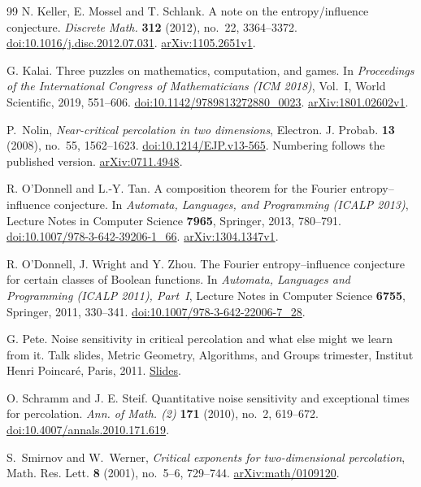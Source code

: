 \documentclass[11pt]{amsart}
\theoremstyle{remark}
\begin{document}
\begin{thebibliography}{99}
N. Keller, E. Mossel and T. Schlank.
A note on the entropy/influence conjecture.
\emph{Discrete Math.} \textbf{312} (2012), no.~22, 3364--3372.
\href{https://doi.org/10.1016/j.disc.2012.07.031}{doi:10.1016/j.disc.2012.07.031}.
\href{https://arxiv.org/abs/1105.2651v1}{arXiv:1105.2651v1}.

G. Kalai.
Three puzzles on mathematics, computation, and games.
In \emph{Proceedings of the International Congress of Mathematicians (ICM 2018)}, Vol.~I, World Scientific, 2019, 551--606.
\href{https://doi.org/10.1142/9789813272880_0023}{doi:10.1142/9789813272880\_0023}.
\href{https://arxiv.org/abs/1801.02602v1}{arXiv:1801.02602v1}.

P.~Nolin,
\emph{Near-critical percolation in two dimensions},
Electron. J. Probab. \textbf{13} (2008), no.~55, 1562--1623.
\href{https://doi.org/10.1214/EJP.v13-565}{doi:10.1214/EJP.v13-565}.
Numbering follows the published version.
\href{https://arxiv.org/abs/0711.4948}{arXiv:0711.4948}.

R. O'Donnell and L.-Y. Tan.
A composition theorem for the Fourier entropy--influence conjecture.
In \emph{Automata, Languages, and Programming (ICALP 2013)},
Lecture Notes in Computer Science \textbf{7965}, Springer, 2013, 780--791.
\href{https://doi.org/10.1007/978-3-642-39206-1_66}{doi:10.1007/978-3-642-39206-1\_66}.
\href{https://arxiv.org/abs/1304.1347v1}{arXiv:1304.1347v1}.

R. O'Donnell, J. Wright and Y. Zhou.
The Fourier entropy--influence conjecture for certain classes of Boolean functions.
In \emph{Automata, Languages and Programming (ICALP 2011), Part~I},
Lecture Notes in Computer Science \textbf{6755}, Springer, 2011, 330--341.
\href{https://doi.org/10.1007/978-3-642-22006-7_28}{doi:10.1007/978-3-642-22006-7\_28}.

G. Pete.
Noise sensitivity in critical percolation and what else might we learn from it.
Talk slides, Metric Geometry, Algorithms, and Groups trimester,
Institut Henri Poincar\'e, Paris, 2011.
\href{https://math.bme.hu/~gabor/IHP.pdf}{Slides}.

O. Schramm and J. E. Steif.
Quantitative noise sensitivity and exceptional times for percolation.
\emph{Ann. of Math. (2)} \textbf{171} (2010), no.~2, 619--672.
\href{https://doi.org/10.4007/annals.2010.171.619}{doi:10.4007/annals.2010.171.619}.

S.~Smirnov and W.~Werner,
\emph{Critical exponents for two-dimensional percolation},
Math. Res. Lett. \textbf{8} (2001), no.~5--6, 729--744.
\href{https://arxiv.org/abs/math/0109120}{arXiv:math/0109120}.


\end{thebibliography}
\end{document}
